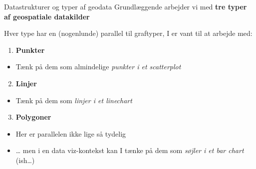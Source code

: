 \documentclass[
  8pt,
  ignorenonframetext,
  aspectratio=169]{beamer}
\providecommand{\tightlist}{%
  \setlength{\itemsep}{0pt}\setlength{\parskip}{0pt}}
\begin{document}
\begin{frame}{Datastrukturer og typer af geodata}
\protect\hypertarget{datastrukturer-og-typer-af-geodata}{}
Grundlæggende arbejder vi med \textbf{tre typer af geospatiale
datakilder}

Hver type har en (nogenlunde) parallel til graftyper, I er vant til at
arbejde med:

\bigskip

\begin{enumerate}
\tightlist
\item
  \textbf{Punkter}
\end{enumerate}

\begin{itemize}
\tightlist
\item
  Tænk på dem som almindelige \emph{punkter i et scatterplot}
\end{itemize}

\begin{enumerate}
\setcounter{enumi}{1}
\tightlist
\item
  \textbf{Linjer}
\end{enumerate}

\begin{itemize}
\tightlist
\item
  Tænk på dem som \emph{linjer i et linechart}
\end{itemize}

\begin{enumerate}
\setcounter{enumi}{2}
\tightlist
\item
  \textbf{Polygoner}
\end{enumerate}

\begin{itemize}
\tightlist
\item
  Her er parallelen ikke lige så tydelig
\item
  \ldots{} men i en data viz-kontekst kan I tænke på dem som
  \emph{søjler i et bar chart} (ish\ldots)
\end{itemize}
\end{frame}
\end{document}
